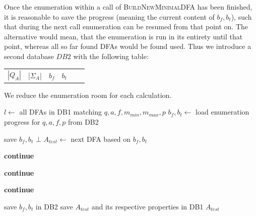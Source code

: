 
Once the enumeration within a call of \textsc{BuildNewMinimalDFA} has been finished, it is reasonable to save the progress (meaning the current content of $b_f, b_t$), such that during the next call enumeration can be resumed from that point on. The alternative would mean, that the enumeration is run in its entirety until that point, whereas all so far found DFAs would be found used. Thus we introduce a second database $DB2$ with the following table:
\begin{center}
	\begin{tabular}{c c c c c c}
		$|Q_A|$ & |$\Sigma_A$| & $b_f$ & $b_t$
	\end{tabular}
\end{center}
We reduce the enumeration room for each calculation.
\vspace{0.2cm}
\begin{algorithmic}[1]
	
		\vspace{0.2cm}
	
		\State $l \gets$ all DFAs in DB1 matching $q, a, f, m_{min}, m_{max}, p$
		\State $b_f, b_t \gets$ load enumeration progress for $q, a, f, p$ from DB2
		
		\vspace{0.2cm}
		
		
			\vspace{0.2cm}
		
				\State save $b_f, b_t$
				\State\Return $\bot$
			\EndIf
			\State $A_{test} \gets$ next DFA based on $b_f, b_t$
			
			\vspace{0.2cm}
			
				\State \textbf{continue}
			\EndIf
			
				\State \textbf{continue}
			\EndIf
			
				\State \textbf{continue}
			\EndIf
			
			\vspace{0.2cm}
			
			\State save $b_f, b_t$ in DB2
			\State save $A_{test}$ and its respective properties in DB1
			\State\Return $A_{test}$
		\EndWhile
	\EndFunction
\end{algorithmic}
\vspace{0.2cm}

